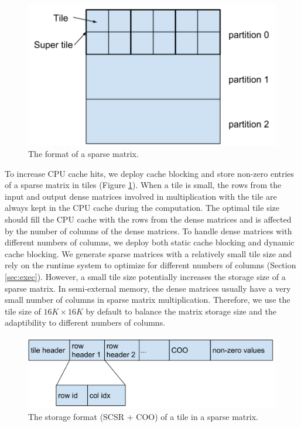 \begin{figure}
\centering
\includegraphics[scale=0.2]{SpMM_figs/sparse_mat.png}
\caption{The format of a sparse matrix.}
\label{sparse_mat}
\end{figure}

To increase CPU cache hits, we deploy cache blocking \cite{Im04} and store
non-zero entries of a sparse matrix in tiles (Figure \ref{sparse_mat}).
When a tile is small, the rows from the input and output dense matrices
involved in multiplication with the tile are always kept in the CPU cache
during the computation. The optimal tile size should fill the CPU cache
with the rows from the dense matrices and is affected by the number of columns
of the dense matrices. To handle dense matrices with different numbers
of columns, we deploy both static cache blocking and dynamic cache blocking.
We generate sparse matrices with a relatively small tile size and
rely on the runtime system
to optimize for different numbers of columns (Section \ref{sec:exec}).
However, a small tile size potentially increases the storage size of a sparse
matrix. In semi-external memory, the dense matrices usually have
a very small number of columns in sparse matrix multiplication. Therefore, we
use the tile size of $16K \times 16K$ by default to balance the matrix storage
size and the adaptibility to different numbers of columns.

\begin{figure}
\centering
\includegraphics[scale=0.2]{SpMM_figs/tile_format.png}
\caption{The storage format (SCSR + COO) of a tile in a sparse matrix.}
\label{tile_format}
\end{figure}


